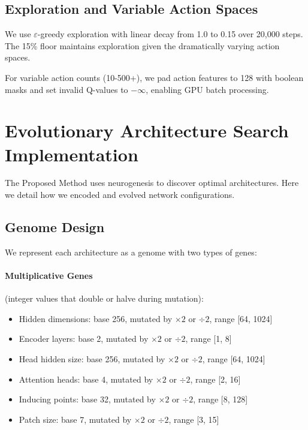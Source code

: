 \subsection{Exploration and Variable Action Spaces}

We use $\varepsilon$-greedy exploration with linear decay from 1.0 to 0.15 over 20,000 steps. The 15\% floor maintains exploration given the dramatically varying action spaces.

For variable action counts (10-500+), we pad action features to 128 with boolean masks and set invalid Q-values to $-\infty$, enabling GPU batch processing.

\section{Evolutionary Architecture Search Implementation}
\label{sec:genome_flexibility}

The Proposed Method uses neurogenesis to discover optimal architectures. Here we detail how we encoded and evolved network configurations.

\subsection{Genome Design}

We represent each architecture as a genome with two types of genes:

\paragraph{Multiplicative Genes} (integer values that double or halve during mutation):
\begin{itemize}
    \item Hidden dimensions: base 256, mutated by $\times 2$ or $\div 2$, range [64, 1024]
    \item Encoder layers: base 2, mutated by $\times 2$ or $\div 2$, range [1, 8]
    \item Head hidden size: base 256, mutated by $\times 2$ or $\div 2$, range [64, 1024]
    \item Attention heads: base 4, mutated by $\times 2$ or $\div 2$, range [2, 16]
    \item Inducing points: base 32, mutated by $\times 2$ or $\div 2$, range [8, 128]
    \item Patch size: base 7, mutated by $\times 2$ or $\div 2$, range [3, 15]
\end{itemize}

